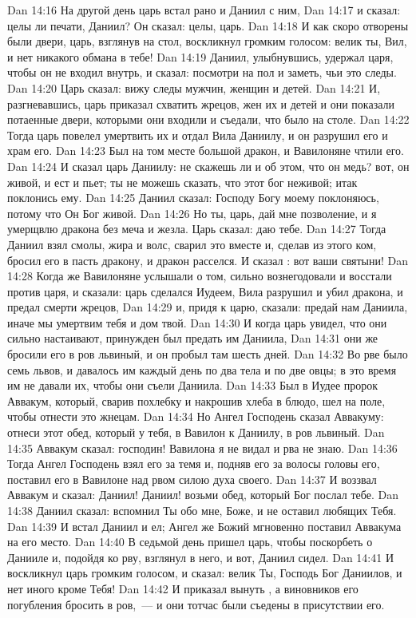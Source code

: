 \vs Dan 14:16 На другой день царь встал рано и Даниил с ним,
\vs Dan 14:17 и сказал: целы ли печати, Даниил? Он сказал: целы, царь.
\vs Dan 14:18 И как скоро отворены были двери, царь, взглянув на стол, воскликнул громким голосом: велик ты, Вил, и нет никакого обмана в тебе!
\vs Dan 14:19 Даниил, улыбнувшись, удержал царя, чтобы он не входил внутрь, и сказал: посмотри на пол и заметь, чьи это следы.
\vs Dan 14:20 Царь сказал: вижу следы мужчин, женщин и детей.
\vs Dan 14:21 И, разгневавшись, царь приказал схватить жрецов, жен их и детей и они показали потаенные двери, которыми они входили и съедали, что было на столе.
\vs Dan 14:22 Тогда царь повелел умертвить их и отдал Вила Даниилу, и он разрушил его и храм его.
\rsbpar\vs Dan 14:23 Был на том месте большой дракон, и Вавилоняне чтили его.
\vs Dan 14:24 И сказал царь Даниилу: не скажешь ли и об этом, что он медь? вот, он живой, и ест и пьет; ты не можешь сказать, что этот бог неживой; итак поклонись ему.
\vs Dan 14:25 Даниил сказал: Господу Богу моему поклоняюсь, потому что Он Бог живой.
\vs Dan 14:26 Но ты, царь, дай мне позволение, и я умерщвлю дракона без меча и жезла. Царь сказал: даю тебе.
\vs Dan 14:27 Тогда Даниил взял смолы, жира и волс, сварил это вместе и, сделав из этого ком, бросил его в пасть дракону, и дракон расселся. И сказал : вот ваши святыни!
\vs Dan 14:28 Когда же Вавилоняне услышали о том, сильно вознегодовали и восстали против царя, и сказали: царь сделался Иудеем, Вила разрушил и убил дракона, и предал смерти жрецов,
\vs Dan 14:29 и, придя к царю, сказали: предай нам Даниила, иначе мы умертвим тебя и дом твой.
\vs Dan 14:30 И когда царь увидел, что они сильно настаивают, принужден был предать им Даниила,
\vs Dan 14:31 они же бросили его в ров львиный, и он пробыл там шесть дней.
\vs Dan 14:32 Во рве было семь львов, и давалось им каждый день по два тела и по две овцы; в это время им не давали их, чтобы они съели Даниила.
\rsbpar\vs Dan 14:33 Был в Иудее пророк Аввакум, который, сварив похлебку и накрошив хлеба в блюдо, шел на поле, чтобы отнести это жнецам.
\vs Dan 14:34 Но Ангел Господень сказал Аввакуму: отнеси этот обед, который у тебя, в Вавилон к Даниилу, в ров львиный.
\vs Dan 14:35 Аввакум сказал: господин! Вавилона я  не видал и рва не знаю.
\vs Dan 14:36 Тогда Ангел Господень взял его за темя и, подняв его за волосы головы его, поставил его в Вавилоне над рвом силою духа своего.
\vs Dan 14:37 И воззвал Аввакум и сказал: Даниил! Даниил! возьми обед, который Бог послал тебе.
\vs Dan 14:38 Даниил сказал: вспомнил Ты обо мне, Боже, и не оставил любящих Тебя.
\vs Dan 14:39 И встал Даниил и ел; Ангел же Божий мгновенно поставил Аввакума на его место.
\rsbpar\vs Dan 14:40 В седьмой день пришел царь, чтобы поскорбеть о Данииле и, подойдя ко рву, взглянул в него, и вот, Даниил сидел.
\vs Dan 14:41 И воскликнул царь громким голосом, и сказал: велик Ты, Господь Бог Даниилов, и нет иного кроме Тебя!
\vs Dan 14:42 И приказал вынуть , а виновников его погубления бросить в ров,~--- и они тотчас были съедены в присутствии его.
